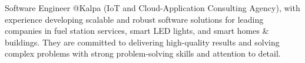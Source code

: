

\begin{cvparagraph}

Software Engineer @Kalpa (IoT and Cloud-Application Consulting Agency), with experience developing scalable and robust software solutions for leading companies in fuel station services, smart LED lights, and smart homes \& buildings. They are committed to delivering high-quality results and solving complex problems with strong problem-solving skills and attention to detail.
\end{cvparagraph}